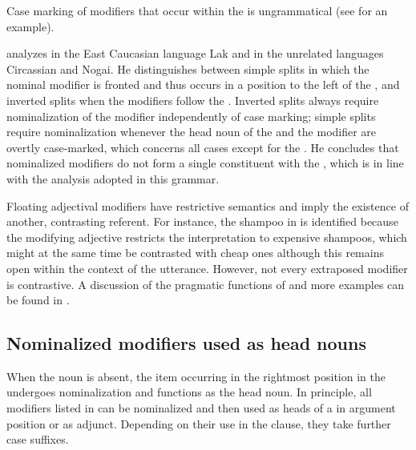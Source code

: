 Case marking of modifiers that occur within the  is ungrammatical (see  for an example).

\citet{Kazenin2009} analyzes  in the East Caucasian language Lak and in the unrelated languages Circassian and Nogai. He distinguishes between simple splits in which the nominal modifier is fronted and thus occurs in a position to the left of the , and inverted splits when the modifiers follow the . Inverted splits always require nominalization of the modifier independently of case marking; simple splits require nominalization whenever the head noun of the  and the modifier are overtly case-marked, which concerns all cases except for the . He concludes that nominalized modifiers do not form a single constituent with the , which is in line with the analysis adopted in this grammar.

Floating adjectival modifiers have restrictive semantics and imply the existence of another, contrasting referent. For instance, the shampoo in  is identified because the modifying adjective restricts the interpretation to expensive shampoos, which might at the same time be contrasted with cheap ones although this remains open within the context of the utterance. However, not every extraposed modifier is contrastive. A discussion of the pragmatic functions of  and more examples can be found in .



\subsection{Nominalized modifiers used as head nouns}
\label{ssec:Headless noun phrases and nominalizations}

When the noun is absent, the item occurring in the rightmost position in the  undergoes nominalization and functions as the head noun. In principle, all modifiers listed in  can be nominalized and then used as heads of a  in argument position or as adjunct. Depending on their use in the clause, they take further case suffixes. 
 
